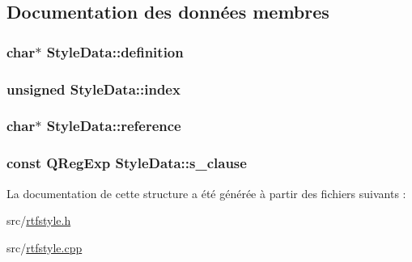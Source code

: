 \subsection{Documentation des données membres}
\hypertarget{struct_style_data_a604f4e5cb27a87ada3ca30bd4b196650}{}
\subsubsection[{definition}]{\setlength{\rightskip}{0pt plus 5cm}char$\ast$ Style\+Data\+::definition}\label{struct_style_data_a604f4e5cb27a87ada3ca30bd4b196650}
\hypertarget{struct_style_data_ac74fb0d3bea6b08d24488c66dabae064}{}
\subsubsection[{index}]{\setlength{\rightskip}{0pt plus 5cm}unsigned Style\+Data\+::index}\label{struct_style_data_ac74fb0d3bea6b08d24488c66dabae064}
\hypertarget{struct_style_data_aa83b48b8d838f93571decb3160be8c0a}{}
\subsubsection[{reference}]{\setlength{\rightskip}{0pt plus 5cm}char$\ast$ Style\+Data\+::reference}\label{struct_style_data_aa83b48b8d838f93571decb3160be8c0a}
\hypertarget{struct_style_data_a33092391b83203d69fc4532b460cec39}{}
\subsubsection[{s\+\_\+clause}]{\setlength{\rightskip}{0pt plus 5cm}const {\bf Q\+Reg\+Exp} Style\+Data\+::s\+\_\+clause\hspace{0.3cm}{\ttfamily [static]}}\label{struct_style_data_a33092391b83203d69fc4532b460cec39}


La documentation de cette structure a été générée à partir des fichiers suivants \+:\begin{DoxyCompactItemize}
\item 
src/\hyperlink{rtfstyle_8h}{rtfstyle.\+h}\item 
src/\hyperlink{rtfstyle_8cpp}{rtfstyle.\+cpp}\end{DoxyCompactItemize}
